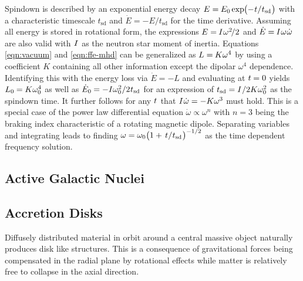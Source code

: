 Spindown is described by an exponential energy decay $E = \kern-0.3pt E_0 \kern-0.2pt \exp \kern-2.0pt
\smash{\bigl( - \kern+0.5pt t \kern+0.1pt / \kern+0.2pt t_\text{sd} \kern+0.5pt \bigr)}$ with a characteristic timescale
$t_\text{sd}$ and $\dot{E} = - E / t_\text{sd}$ for the time derivative. Assuming all energy is stored in
rotational form, the expressions $E = \kern-0.5pt I \kern+0.5pt \omega^2 \kern-1.5pt / 2$ and
$\dot{E} = \kern-0.5pt I \kern+0.5pt \omega \kern+0.5pt \dot{\omega}$ are also valid with $I \kern+0.5pt$ as the neutron star
moment of inertia. Equations \eqref{eqn:vacuum} and \eqref{eqn:ffe-mhd} can be generalized as $L = \kern-0.5pt K \omega^4$ by
using a coefficient $K$ containing all other information except the dipolar $\omega^4$ dependence. Identifying this with the energy
loss via $\dot{E} = -L$ and evaluating at $t \kern-0.3pt= 0$ yields $L_0 \kern-0.3pt = \kern-0.2pt K \omega_0^4$ as well as
$\dot{E}_0 \kern-0.3pt = -I \omega_0^2 / 2 \kern+0.4pt t_\text{sd}$ for an expression of
$t_\text{sd} = I \kern+0.5pt / 2K\omega_0^2$ as the spindown time. It further follows for any $t \kern+0.5pt$ that
$I \kern+0.5pt \dot{\omega} = -K \omega^3$ must hold. This is a special case of the power law differential equation
$\dot{\omega} \propto \omega^n$ with $n = 3$ being the braking index characteristic of a rotating magnetic dipole. Separating
variables and integrating leads to finding
$\omega = \omega_0 \smash{\bigl( 1 + \kern+1.5pt t \kern+0.1pt / \kern+0.2pt t_\text{sd} \kern+0.5pt \bigr)^{-1/2}}$
as the time dependent frequency solution.



\subsection{Active Galactic Nuclei}
\label{sub:nuclei}

\cite{Murase_2023} \cite{Visser_2008} \cite{Abramowicz_2013} \cite{Blandford_2019}



\subsection{Accretion Disks}
\label{sub:accretion}

Diffusely distributed material in orbit around a central massive object naturally produces disk like structures. This is a
consequence of gravitational forces being compensated in the radial plane by rotational effects while matter is relatively
free to collapse in the axial direction. 



